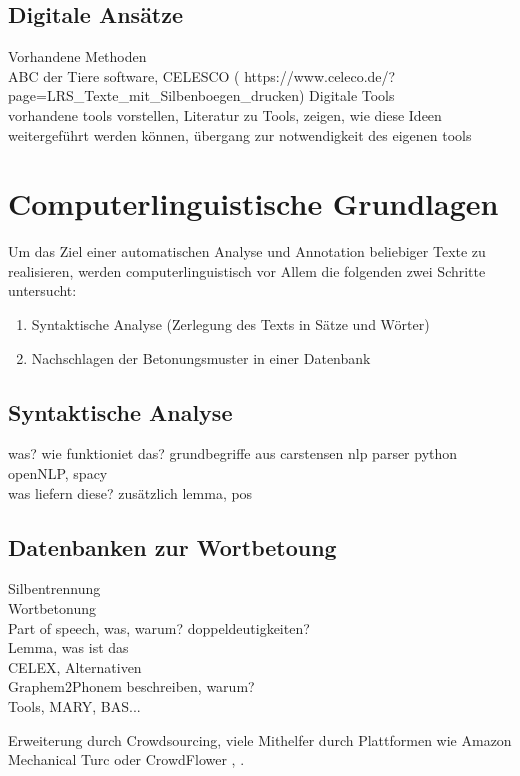 \subsection{Digitale Ansätze}
Vorhandene Methoden\\
ABC der Tiere software, CELESCO ( https://www.celeco.de/?page=LRS\_Texte\_mit\_Silbenboegen\_drucken)
Digitale Tools\\

vorhandene tools vorstellen, Literatur zu Tools, zeigen, wie diese Ideen weitergeführt werden können, übergang zur notwendigkeit des eigenen tools\\

\section{Computerlinguistische Grundlagen}

Um das Ziel einer automatischen Analyse und Annotation beliebiger Texte zu realisieren, werden computerlinguistisch vor Allem die folgenden zwei Schritte untersucht:
\begin{enumerate}
	\item Syntaktische Analyse (Zerlegung des Texts in Sätze und Wörter)
	\item Nachschlagen der Betonungsmuster in einer Datenbank
\end{enumerate}

\subsection{Syntaktische Analyse}
was? wie funktioniet das?
grundbegriffe aus carstensen\cite{Carstensen2009}
nlp parser python openNLP, spacy\\
was liefern diese? zusätzlich lemma, pos\\

\subsection{Datenbanken zur Wortbetoung}
Silbentrennung\\
Wortbetonung\\
Part of speech, was, warum? doppeldeutigkeiten?\\
Lemma, was ist das\\
CELEX, Alternativen\\
Graphem2Phonem beschreiben, warum?\\
Tools, MARY, BAS...

Erweiterung durch Crowdsourcing, viele Mithelfer durch Plattformen wie Amazon Mechanical Turc\cite{Snow2008} oder CrowdFlower  \cite{Meurers2015}, \cite{Zaidan2011}.